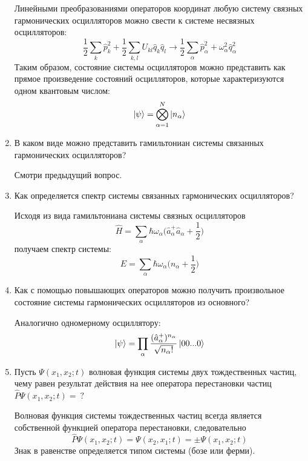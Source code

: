 \documentclass{article}
\begin{document}
\begin{enumerate}
	Линейными преобразованиями операторов координат любую систему связных гармонических осцилляторов можно свести к системе несвязных осцилляторов:
	\begin{equation}
	\frac{1}{2} \sum\limits_{k} \hat{p}^2_k + \frac{1}{2} \sum\limits_{k,l} U_{kl}\hat{q}_k\hat{q}_l \to \frac{1}{2} \sum\limits_{\alpha} \hat{p}^2_\alpha + \omega^2_\alpha\hat{q}^2_\alpha
	\end{equation}
	Таким образом, состояние системы осцилляторов можно представить как прямое произведение состояний осцилляторов, которые характеризуются одном квантовым числом:
	\begin{equation}
		\ket{\psi} = \bigotimes\limits_{\alpha = 1}^N \ket{n_\alpha}
	\end{equation}
	
	\item {В каком виде можно представить гамильтониан системы связанных гармонических осцилляторов?}
	
	Смотри предыдущий вопрос.
	
	\item {Как определяется спектр системы связанных гармонических осцилляторов?}
	
	Исходя из вида гамильтониана системы связных осцилляторов
	\begin{equation}
		\hat{H} = \sum\limits_{\alpha} \hbar \omega_\alpha \Big( \hat{a}^+_\alpha \hat{a}_\alpha + \frac{1}{2} \Big)
	\end{equation}
	получаем спектр системы:
	\begin{equation}
		E = \sum\limits_{\alpha} \hbar \omega_\alpha \Big( n_\alpha + \frac{1}{2} \Big)
	\end{equation}
	
	\item {Как с помощью повышающих операторов можно получить произвольное состояние системы гармонических осцилляторов из основного?}

	Аналогично одномерному осциллятору:
	\begin{equation}
		\ket{\psi} = \prod\limits_{\alpha} \frac{(\hat{a}^+_\alpha)^{n_\alpha}}{\sqrt{n_\alpha!}} \ket{00...0}
	\end{equation}		
	
	\item {Пусть $\Psi(x_1, x_2;t)$ волновая функция системы двух тождественных частиц, чему равен результат действия на нее оператора перестановки частиц $\hat{P}\Psi(x_1, x_2;t) = \ ?$}
	
	Волновая функция системы тождественных частиц всегда является собственной функцией оператора перестановки, следовательно
	\begin{equation}
		\hat{P}\Psi(x_1, x_2;t) = \Psi(x_2, x_1;t) = \pm \Psi(x_1, x_2;t)
	\end{equation}
	Знак в равенстве определяется типом системы (бозе или ферми).
	

\end{enumerate}
\end{document}
